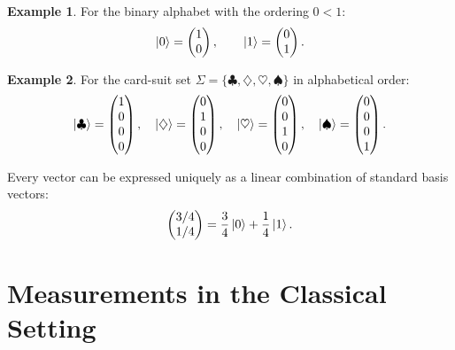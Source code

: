 \documentclass[11pt]{article}
\theoremstyle{definition}
\newtheorem{example}{Example}[section]
\begin{document}
\begin{example}
For the binary alphabet with the ordering $0<1$:
\[
    \ket{0} = \begin{pmatrix}1\\0\end{pmatrix}, \qquad
    \ket{1} = \begin{pmatrix}0\\1\end{pmatrix}.
\]
\end{example}

\begin{example}
For the card-suit set $\Sigma=\{\clubsuit,\diamondsuit,\heartsuit,\spadesuit\}$ in alphabetical order:
\[
    \ket{\clubsuit}=\begin{pmatrix}1\\0\\0\\0\end{pmatrix},\quad
    \ket{\diamondsuit}=\begin{pmatrix}0\\1\\0\\0\end{pmatrix},\quad
    \ket{\heartsuit}=\begin{pmatrix}0\\0\\1\\0\end{pmatrix},\quad
    \ket{\spadesuit}=\begin{pmatrix}0\\0\\0\\1\end{pmatrix}.
\]
\end{example}

Every vector can be expressed uniquely as a linear combination of standard basis vectors:
\[
    \begin{pmatrix}3/4\\1/4\end{pmatrix}
    = \frac{3}{4}\ket{0}+\frac{1}{4}\ket{1}.
\]

\section{Measurements in the Classical Setting}
\end{document}

